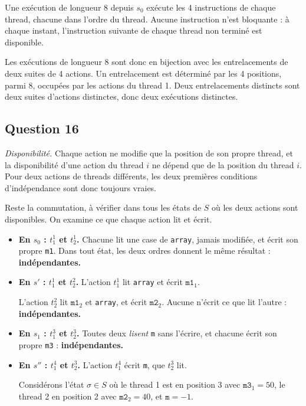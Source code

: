 \documentclass[11pt,a4paper]{article}
\newcommand{\equationajustee}[1]{%
  \sbox{\boiteequation}{$\displaystyle #1$}%
  \ifdim\wd\boiteequation>\linewidth
    \[\resizebox{\linewidth}{!}{\usebox{\boiteequation}}\]%
  \else
    \[#1\]%
  \fi}
\begin{document}
Une exécution de longueur 8 depuis \(s_0\) exécute les 4 instructions de chaque thread, chacune dans l'ordre du thread. Aucune instruction n'est bloquante : à chaque instant, l'instruction suivante de chaque thread non terminé est disponible.

Les exécutions de longueur 8 sont donc en bijection avec les entrelacements de deux suites de 4 actions. Un entrelacement est déterminé par les 4 positions, parmi 8, occupées par les actions du thread 1. Deux entrelacements distincts sont deux suites d'actions distinctes, donc deux exécutions distinctes.

\equationajustee{\boxed{\binom{8}{4}=70 \text{ \text{exécutions}}}}

\hypertarget{question-16}{%
\subsection{Question 16}\label{question-16}}

\emph{Disponibilité.} Chaque action ne modifie que la position de son propre thread, et la disponibilité d'une action du thread \(i\) ne dépend que de la position du thread \(i\). Pour deux actions de threads différents, les deux premières conditions d'indépendance sont donc toujours vraies.

Reste la commutation, à vérifier dans tous les états de \(S\) où les deux actions sont disponibles. On examine ce que chaque action lit et écrit.

\begin{itemize}
\item
  \textbf{En \(s_0\) : \(t_1^1\) et \(t_2^1\).} Chacune lit une case de \texttt{array}, jamais modifiée, et écrit son propre \texttt{m1}. Dans tout état, les deux ordres donnent le même résultat : \textbf{indépendantes.}
\item
  \textbf{En \(s'\) : \(t_1^1\) et \(t_2^2\).} L'action \(t_1^1\) lit \texttt{array} et écrit \(\texttt{m1}_1\).

  L'action \(t_2^2\) lit \(\texttt{m1}_2\) et \texttt{array}, et écrit \(\texttt{m2}_2\). Aucune n'écrit ce que lit l'autre : \textbf{indépendantes.}
\item
  \textbf{En \(s_1\) : \(t_1^3\) et \(t_2^3\).} Toutes deux \emph{lisent} \texttt{m} sans l'écrire, et chacune écrit son propre \texttt{m3} : \textbf{indépendantes.}
\item
  \textbf{En \(s''\) : \(t_1^4\) et \(t_2^3\).} L'action \(t_1^4\) écrit \texttt{m}, que \(t_2^3\) lit.

  Considérons l'état \(\sigma\in S\) où le thread 1 est en position 3 avec \(\texttt{m3}_1=50\), le thread 2 en position 2 avec \(\texttt{m2}_2=40\), et \(\texttt m=-1\).
\end{itemize}
\end{document}
